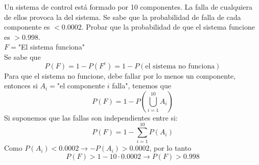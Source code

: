 \item Un sistema de control está formado por 10 componentes. La falla de cualquiera de ellos provoca la del sistema. Se sabe que la probabilidad de falla de cada componente es $<0.0002$. Probar que la probabilidad de que el sistema funcione es $>0.998$.\e\\
    $F=$"El sistema funciona"\\
    Se sabe que\[P(F)=1-P(F^c)=1-P(\text{el sistema no funciona})\]
    Para que el sistema no funcione, debe fallar por lo menos un componente, entonces si $A_i=$"el componente $i$ falla", tenemos que
    \[P(F)=1-P\left(\bigcup\limits_{i=1}^{10}A_i\right)\]
    Si suponemos que las fallas son independientes entre si:
    \[P(F)=1-\sum\limits_{i=1}^{10}P(A_i)\]
    Como $P(A_i)<0.0002\to-P(A_i)>0.0002$, por lo tanto
    \[P(F)>1-10\cdot0.0002\to P(F)>0.998\]